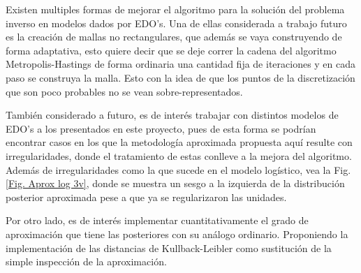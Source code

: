 Existen multiples formas de mejorar el algoritmo para la solución del problema inverso en modelos dados por EDO's. Una de ellas considerada a trabajo futuro es la creación de mallas no rectangulares, que además se vaya construyendo de forma adaptativa, esto quiere decir que se deje correr la cadena del algoritmo Metropolis-Hastings de forma ordinaria una cantidad fija de iteraciones y en cada paso se construya la malla. Esto con la idea de que los puntos de la discretización que son poco probables no se vean sobre-representados.

También considerado a futuro, es de interés trabajar con distintos modelos de EDO's a los presentados en este proyecto, pues de esta forma se podrían encontrar casos en los que la metodología aproximada propuesta aquí resulte con irregularidades, donde el tratamiento de estas conlleve a la mejora del algoritmo. Además de irregularidades como la que sucede en el modelo logístico, vea la Fig. \ref{Fig. Aprox log 3v}, donde se muestra un sesgo a la izquierda de la distribución posterior aproximada pese a que ya se regularizaron las unidades.

Por otro lado, es de interés implementar cuantitativamente el grado de aproximación que tiene las posteriores con su análogo ordinario. Proponiendo la implementación de las distancias de Kullback-Leibler como sustitución de la simple inspección de la aproximación.